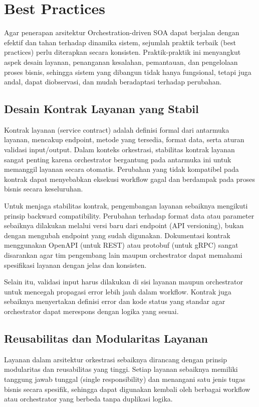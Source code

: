\section{Best Practices}

Agar penerapan arsitektur Orchestration-driven SOA dapat berjalan dengan efektif dan tahan terhadap dinamika sistem, sejumlah praktik terbaik (best practices) perlu diterapkan secara konsisten. Praktik-praktik ini menyangkut aspek desain layanan, penanganan kesalahan, pemantauan, dan pengelolaan proses bisnis, sehingga sistem yang dibangun tidak hanya fungsional, tetapi juga andal, dapat diobservasi, dan mudah beradaptasi terhadap perubahan.

\subsection{Desain Kontrak Layanan yang Stabil}

Kontrak layanan (service contract) adalah definisi formal dari antarmuka layanan, mencakup endpoint, metode yang tersedia, format data, serta aturan validasi input/output. Dalam konteks orkestrasi, stabilitas kontrak layanan sangat penting karena orchestrator bergantung pada antarmuka ini untuk memanggil layanan secara otomatis. Perubahan yang tidak kompatibel pada kontrak dapat menyebabkan eksekusi workflow gagal dan berdampak pada proses bisnis secara keseluruhan.

Untuk menjaga stabilitas kontrak, pengembangan layanan sebaiknya mengikuti prinsip backward compatibility. Perubahan terhadap format data atau parameter sebaiknya dilakukan melalui versi baru dari endpoint (API versioning), bukan dengan mengubah endpoint yang sudah digunakan. Dokumentasi kontrak menggunakan OpenAPI (untuk REST) atau protobuf (untuk gRPC) sangat disarankan agar tim pengembang lain maupun orchestrator dapat memahami spesifikasi layanan dengan jelas dan konsisten.

Selain itu, validasi input harus dilakukan di sisi layanan maupun orchestrator untuk mencegah propagasi error lebih jauh dalam workflow. Kontrak juga sebaiknya menyertakan definisi error dan kode status yang standar agar orchestrator dapat merespons dengan logika yang sesuai.

\subsection{Reusabilitas dan Modularitas Layanan}

Layanan dalam arsitektur orkestrasi sebaiknya dirancang dengan prinsip modularitas dan reusabilitas yang tinggi. Setiap layanan sebaiknya memiliki tanggung jawab tunggal (single responsibility) dan menangani satu jenis tugas bisnis secara spesifik, sehingga dapat digunakan kembali oleh berbagai workflow atau orchestrator yang berbeda tanpa duplikasi logika.

